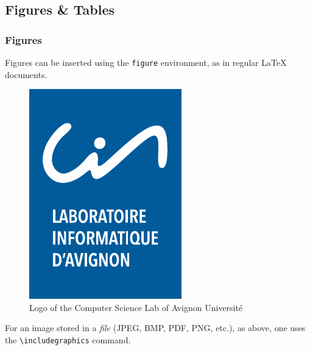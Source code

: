 \documentclass[10pt,    %
    english,            %
    xcolor=table,       %
    envcountsect,       %
    aspectratio=43      %
]{beamer}
\begin{document}
\subsection{Figures \& Tables}
\begin{frame}
    \frametitle{Figures}
    
    Figures can be inserted using the \texttt{figure} environment, as in regular \LaTeX{} documents.
    
    \begin{figure}[H]
        \centering
        \includegraphics[scale=0.5]{images/lia_logo.pdf}
        \caption{Logo of the Computer Science Lab of Avignon Université}
        \label{fig:LIAlogo}
    \end{figure}
    
    For an image stored in a \textit{file} (JPEG, BMP, PDF, PNG, etc.), as above, one uses the \texttt{\textbackslash{}includegraphics} command.
    

    

\end{frame}
\end{document}
